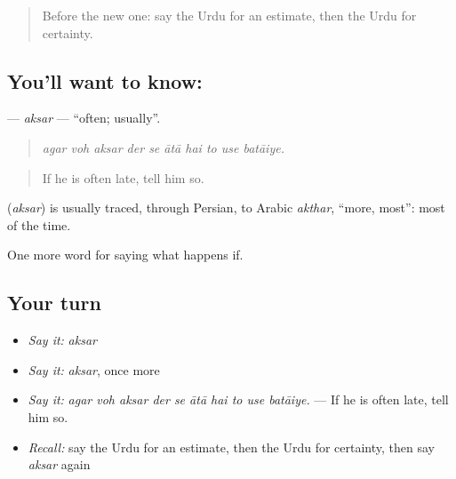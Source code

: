 \label{lesson:UR-C362-aksar}



\begin{quote}
Before the new one: say the Urdu for an estimate, then the Urdu for certainty.
\end{quote}

\subsection*{You'll want to know: }
\textbf{} — \emph{aksar} — \textquotedblleft{}often; usually\textquotedblright{}.

\begin{quote}
         
\end{quote}

\begin{quote}
\emph{agar voh aksar der se ātā hai to use batāiye.}
\end{quote}

\begin{quote}
If he is often late, tell him so.
\end{quote}

\begin{cousinweb}
\textbf{} (\emph{aksar}) is usually traced, through Persian, to Arabic \emph{akthar}, \textquotedblleft{}more, most\textquotedblright{}: most of the time.
\end{cousinweb}

\begin{grammarlens}[title={What you've built}]
One more word for saying what happens if.
\end{grammarlens}

\subsection*{Your turn}
\begin{itemize}
\raggedright
  \item \emph{Say it:} \emph{aksar}
  \item \emph{Say it:} \emph{aksar}, once more
  \item \emph{Say it:} \emph{agar voh aksar der se ātā hai to use batāiye.} — If he is often late, tell him so.
  \item \emph{Recall:} say the Urdu for an estimate, then the Urdu for certainty, then say \emph{aksar} again
\end{itemize}

